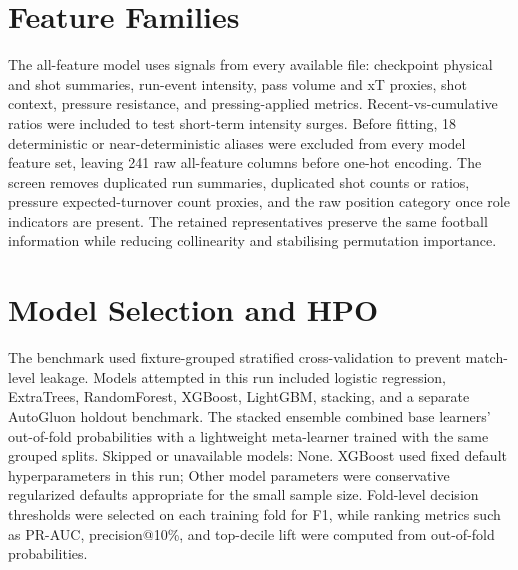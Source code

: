 \documentclass[11pt]{article}
\begin{document}
\section{Feature Families}
The all-feature model uses signals from every available file:
checkpoint physical and shot summaries, run-event intensity, pass volume and xT proxies, shot context, pressure resistance, and pressing-applied metrics.
Recent-vs-cumulative ratios were included to test short-term intensity surges.
Before fitting, 18 deterministic or near-deterministic aliases were excluded from every model feature set, leaving 241 raw all-feature columns before one-hot encoding. The screen removes duplicated run summaries, duplicated shot counts or ratios, pressure expected-turnover count proxies, and the raw position category once role indicators are present. The retained representatives preserve the same football information while reducing collinearity and stabilising permutation importance.

\section{Model Selection and HPO}
The benchmark used fixture-grouped stratified cross-validation to prevent match-level leakage.
Models attempted in this run included logistic regression, ExtraTrees, RandomForest, XGBoost, LightGBM, stacking, and a separate AutoGluon holdout benchmark.
The stacked ensemble combined base learners' out-of-fold probabilities with a lightweight meta-learner trained with the same grouped splits.
Skipped or unavailable models: None.
XGBoost used fixed default hyperparameters in this run; Other model parameters were conservative regularized defaults appropriate for the small sample size. Fold-level decision thresholds were selected on each training fold for F1, while ranking metrics such as PR-AUC, precision@10\%, and top-decile lift were computed from out-of-fold probabilities.
\end{document}
